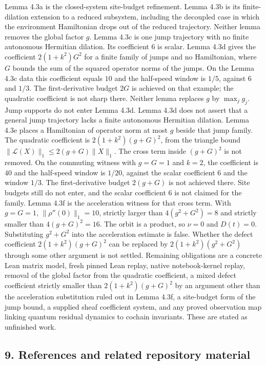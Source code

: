 \documentclass[
  11pt,
]{article}
\begin{document}
Lemma 4.3a is the closed-system site-budget refinement. Lemma 4.3b is
its finite-dilation extension to a reduced subsystem, including the
decoupled case in which the environment Hamiltonian drops out of the
reduced trajectory. Neither lemma removes the global factor \(g\).
Lemma 4.3c is one jump trajectory with no finite autonomous Hermitian dilation.
Its coefficient \(6\) is scalar. Lemma 4.3d gives the coefficient
\(2(1+k^2)G^2\) for a finite family of jumps and no Hamiltonian, where
\(G\) bounds the sum of the squared operator norms of the jumps. On the
Lemma 4.3c data this coefficient equals \(10\) and the half-speed window
is \(1/5\), against \(6\) and \(1/3\). The first-derivative budget \(2G\)
is achieved on that example; the quadratic coefficient is not sharp there.
Neither lemma replaces \(g\) by \(\max_j g_j\). Jump supports do not enter
Lemma 4.3d. Lemma 4.3d does not assert that a general jump trajectory
lacks a finite autonomous Hermitian dilation.
Lemma 4.3e places a Hamiltonian of operator norm at most \(g\) beside
that jump family. The quadratic coefficient is \(2(1+k^2)(g+G)^2\), from
the triangle bound \(\|\mathcal L(X)\|_1\le 2(g+G)\|X\|_1\). The cross
term inside \((g+G)^2\) is not removed. On the commuting witness with
\(g=G=1\) and \(k=2\), the coefficient is \(40\) and the half-speed
window is \(1/20\), against the scalar coefficient \(6\) and the window
\(1/3\). The first-derivative budget \(2(g+G)\) is not achieved there.
Site budgets still do not enter, and the scalar coefficient \(6\) is not
claimed for the family.
Lemma 4.3f is the acceleration witness for that cross term. With
\(g=G=1\), \(\|\rho''(0)\|_1=10\), strictly larger than
\(4(g^2+G^2)=8\) and strictly smaller than \(4(g+G)^2=16\). The orbit
is a product, so \(\nu=0\) and \(D(t)=0\). Substituting \(g^2+G^2\) into
the acceleration estimate is false. Whether the defect coefficient
\(2(1+k^2)(g+G)^2\) can be replaced by \(2(1+k^2)(g^2+G^2)\) through
some other argument is not settled.
Remaining obligations are a concrete Lean matrix model, fresh pinned Lean
replay, native notebook-kernel replay, removal of the global factor from
the quadratic coefficient, a mixed defect coefficient strictly smaller
than \(2(1+k^2)(g+G)^2\) by an argument other than the acceleration
substitution ruled out in Lemma 4.3f, a site-budget form of the jump
bound, a supplied sheaf coefficient system, and any proved observation
map linking quantum residual dynamics to cochain invariants.
These are stated as unfinished work.

\subsection{9. References and related repository material}\label{references-and-related-repository-material}
\end{document}
